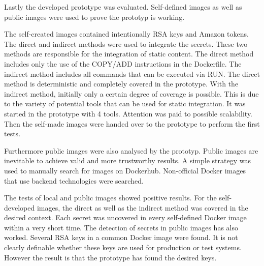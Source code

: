 Lastly the developed prototype was evaluated. 
Self-defined images as well as public images were used to prove the prototyp is working.

The self-created images contained intentionally RSA keys and Amazon tokens.
The direct and indirect methods were used to integrate the secrets.
These two methods are responsible for the integration of static content.
The direct method includes only the use of the COPY/ADD instructions in the Dockerfile.
The indirect method includes all commands that can be executed via RUN.
The direct method is deterministic and completely covered in the prototype.
With the indirect method, initially only a certain degree of coverage is possible.
This is due to the variety of potential tools that can be used for static integration.
It was started in the prototype with 4 tools. Attention was paid to possible scalability.
Then the self-made images were handed over to the prototype to perform the first tests.

Furthermore public images were also analysed by the prototyp.
Public images are inevitable to achieve valid and more trustworthy results.
A simple strategy was used to manually search for images on Dockerhub.
Non-official Docker images that use backend technologies were searched.

The tests of local and public images showed positive results.
For the self-developed images, the direct as well as the indirect method was covered in the desired context.
Each secret was uncovered in every self-defined Docker image within a very short time.
The detection of secrets in public images has also worked.
Several RSA keys in a common Docker image were found.
It is not clearly definable whether these keys are used for production or test systems.
However the result is that the prototype has found the desired keys.






